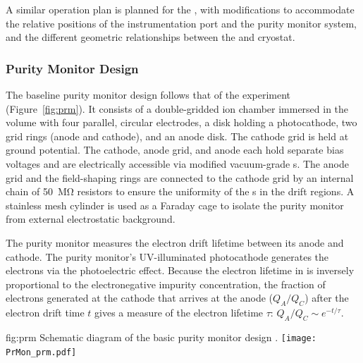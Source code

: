   A similar %
  operation plan is planned for %
  the , with modifications to accommodate the relative positions of the instrumentation port %
  and the purity monitor system, and the %
  different geometric relationships between the  and cryostat.

\subsubsection{Purity Monitor Design}

The  baseline purity monitor design follows that of  the  experiment (Figure~\ref{fig:prm})\cite{Adamowski:2014daa}.  It consists of a double-gridded ion chamber immersed in the  volume with four parallel, circular electrodes, a disk holding a photocathode, two grid rings (anode and cathode), and an anode disk. The cathode grid is held at ground potential. The cathode, anode grid, and anode 
each hold separate bias voltages and are electrically accessible via modified vacuum-grade  \fdth{}s. %
The anode grid and the field-shaping rings are connected to the cathode grid by an internal chain of \SI{50}{\mega\ohm} resistors to ensure the uniformity of the \efield{}s in the drift regions. A stainless mesh cylinder is used as a Faraday cage to isolate the purity monitor from external electrostatic background. 

The purity monitor measures the electron drift lifetime between its anode and cathode. The purity monitor's UV-illuminated %
photocathode generates the electrons via the photoelectric effect. Because the electron lifetime in  is inversely proportional to the electronegative impurity concentration, the fraction of electrons generated at the cathode that arrives at the anode ($Q_A/Q_C$) after the electron drift time $t$ gives a measure of the electron lifetime $\tau$:
%
\( Q_A/Q_C \sim e^{-t/\tau}.\)



\begin{dunefigure}{fig:prm}
  {Schematic diagram of the basic purity monitor design \cite{Adamowski:2014daa}.}
  \texttt{[image: PrMon\_prm.pdf]}
\end{dunefigure}


